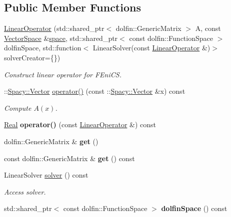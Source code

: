 \subsection*{\-Public \-Member \-Functions}
\begin{DoxyCompactItemize}
\item 
\hyperlink{classSpacy_1_1FEniCS_1_1LinearOperator_a8ba6feb654775a01187cf723e96c70dc}{\-Linear\-Operator} (std\-::shared\-\_\-ptr$<$ dolfin\-::\-Generic\-Matrix $>$ \-A, const \hyperlink{classSpacy_1_1VectorSpace}{\-Vector\-Space} \&\hyperlink{classSpacy_1_1VectorBase_aa999dbf9d679d895dfe04c10fbf9f5e9}{space}, std\-::shared\-\_\-ptr$<$ const dolfin\-::\-Function\-Space $>$ dolfin\-Space, std\-::function$<$ \-Linear\-Solver(const \hyperlink{classSpacy_1_1FEniCS_1_1LinearOperator}{\-Linear\-Operator} \&)$>$ solver\-Creator=\{\})
\begin{DoxyCompactList}\small\item\em \-Construct linear operator for \-F\-Eni\-C\-S. \end{DoxyCompactList}\item 
\-::\hyperlink{classSpacy_1_1Vector}{\-Spacy\-::\-Vector} \hyperlink{classSpacy_1_1FEniCS_1_1LinearOperator_af4c055f20d5019a6b6da0264b5d9db26}{operator()} (const \-::\hyperlink{classSpacy_1_1Vector}{\-Spacy\-::\-Vector} \&x) const 
\begin{DoxyCompactList}\small\item\em \-Compute $A(x)$. \end{DoxyCompactList}\item 
\hypertarget{classSpacy_1_1FEniCS_1_1LinearOperator_ad90dbc886d4ea2ec5b3d4559ac317f2a}{\hyperlink{classSpacy_1_1Real}{\-Real} {\bfseries operator()} (const \hyperlink{classSpacy_1_1FEniCS_1_1LinearOperator}{\-Linear\-Operator} \&) const }\label{classSpacy_1_1FEniCS_1_1LinearOperator_ad90dbc886d4ea2ec5b3d4559ac317f2a}

\item 
\hypertarget{classSpacy_1_1FEniCS_1_1LinearOperator_aed1bff676a51026478d658774c1a0cb9}{dolfin\-::\-Generic\-Matrix \& {\bfseries get} ()}\label{classSpacy_1_1FEniCS_1_1LinearOperator_aed1bff676a51026478d658774c1a0cb9}

\item 
\hypertarget{classSpacy_1_1FEniCS_1_1LinearOperator_a5acf3011cf98e3da25dedaa83d876477}{const dolfin\-::\-Generic\-Matrix \& {\bfseries get} () const }\label{classSpacy_1_1FEniCS_1_1LinearOperator_a5acf3011cf98e3da25dedaa83d876477}

\item 
\-Linear\-Solver \hyperlink{classSpacy_1_1FEniCS_1_1LinearOperator_aa5aacfc25bb0d710f56c2323753d451f}{solver} () const 
\begin{DoxyCompactList}\small\item\em \-Access solver. \end{DoxyCompactList}\item 
\hypertarget{classSpacy_1_1FEniCS_1_1LinearOperator_a9edb2a6eac66a2379792ef5580fcae75}{std\-::shared\-\_\-ptr$<$ const \*
dolfin\-::\-Function\-Space $>$ {\bfseries dolfin\-Space} () const }\label{classSpacy_1_1FEniCS_1_1LinearOperator_a9edb2a6eac66a2379792ef5580fcae75}


\end{DoxyCompactItemize}
